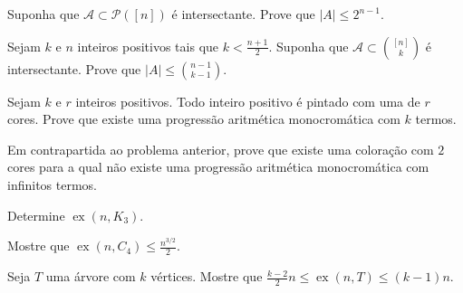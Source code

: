 \documentclass[10pt,a4paper]{article}
\DeclareMathOperator\ex{ex}
\begin{document}




\begin{prob}
	Suponha que $\mathcal{A} \subset \mathcal{P}([n])$ é intersectante. Prove que $|A| \le 2^{n-1}$.
\end{prob}


\begin{prob}%
	Sejam $k$ e $n$ inteiros positivos tais que $k < \frac{n+1}{2}$.
	Suponha que $\mathcal{A} \subset \binom{[n]}{k}$ é intersectante. Prove que $|A| \le \binom{n-1}{k-1}$.
\end{prob}

\begin{prob}
	Sejam $k$ e $r$ inteiros positivos. Todo inteiro positivo é pintado com uma de $r$ cores. Prove que existe uma progressão aritmética monocromática com $k$ termos.
\end{prob}

\begin{prob}
	Em contrapartida ao problema anterior, prove que existe uma coloração com $2$ cores para a qual não existe uma progressão aritmética monocromática com infinitos termos.
\end{prob}

\begin{prob}
	Determine $\ex(n, K_3)$.
\end{prob}

\begin{prob}
	Mostre que $\ex(n, C_4) \leq \frac{n^{3/2}}{2}$.
\end{prob}

\begin{prob}
	Seja $T$ uma árvore com $k$ vértices. Mostre que $\frac{k-2}{2}n \leq \ex(n, T) \leq (k-1)n$.

\end{prob}
\end{document}
